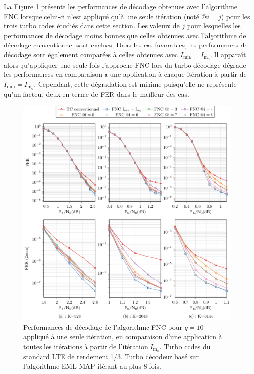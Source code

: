 La Figure 
\ref{fig:fnc_onlyX} présente les performances de décodage obtenues avec l'algorithme FNC lorsque celui-ci n'est appliqué
qu'à une seule itération (noté $@i=j$) pour les trois turbo codes étudiés dans cette section. Les valeurs de $j$ pour lesquelles les performances de décodage moins bonnes que celles 
obtenues avec l'algorithme de décodage conventionnel sont exclues. Dans les cas favorables, les performances de décodage 
sont également comparées à celles obtenues avec $I_\text{min} = I_{\text{m}_\text{o}}$. Il apparaît alors qu'appliquer une 
seule fois l'approche FNC lors du turbo décodage dégrade les performances en comparaison à une application à chaque itération à partir de $I_\text{min}
 = I_{\text{m}_\text{o}}$. Cependant, cette dégradation est minime puisqu'elle ne représente qu'un facteur deux en terme de FER dans le 
 meilleur des cas.

\begin{figure}[!ht]
	\centering
	\hspace*{-.1\textwidth}
	\includegraphics[width=1.12\textwidth]{main/ch4_fig/final/tikz_last/fnc10_onlyX.pdf}
	\caption{Performances de décodage de l'algorithme FNC pour $q=10$ appliqué à une seule itération, en comparaison
	d'une application à toutes les itérations à partir de l'itération  $I_{\text{m}_\text{o}}$.
	Turbo codes du standard LTE de rendement 1/3. 
	Turbo décodeur basé sur l'algorithme EML-MAP itérant au plus 8 fois.
	\label{fig:fnc_onlyX}}
	\vspace*{-1ex}
\end{figure}

